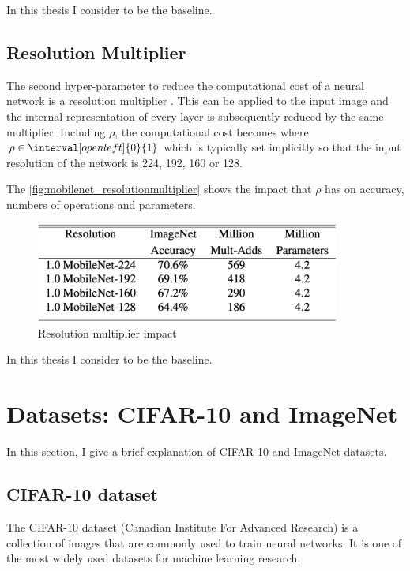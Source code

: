 In this thesis I consider  to be the baseline.

\subsection{Resolution Multiplier}
The second hyper-parameter to reduce the computational cost of a neural network
is a resolution multiplier \bm{$\rho$}. This can be applied to the input image
and the internal representation of every layer is subsequently reduced by the
same multiplier.
Including $\rho$, the computational cost becomes  where $\rho \in \interval[open left]{0}{1}$ which is
typically set implicitly so that the input resolution of the network is 224,
192, 160 or 128.

The \autoref{fig:mobilenet_resolutionmultiplier} shows the impact that $\rho$
has on accuracy, numbers of operations and parameters.

\begin{figure}[ht]
    \includegraphics[width=10cm]{images/experiments/mobilenet_resolutionmultiplier.png}
    \centering
    \caption{Resolution multiplier impact}\label{fig:mobilenet_resolutionmultiplier}
\end{figure}

In this thesis I consider  to be the baseline.

\section{Datasets: CIFAR-10 and ImageNet}
In this section, I give a brief explanation of CIFAR-10 and ImageNet datasets.

\subsection{CIFAR-10 dataset}
The CIFAR-10 dataset (Canadian Institute For Advanced Research) is a collection
of images that are commonly used to train neural networks. It is one of the
most widely used datasets for machine learning research.

